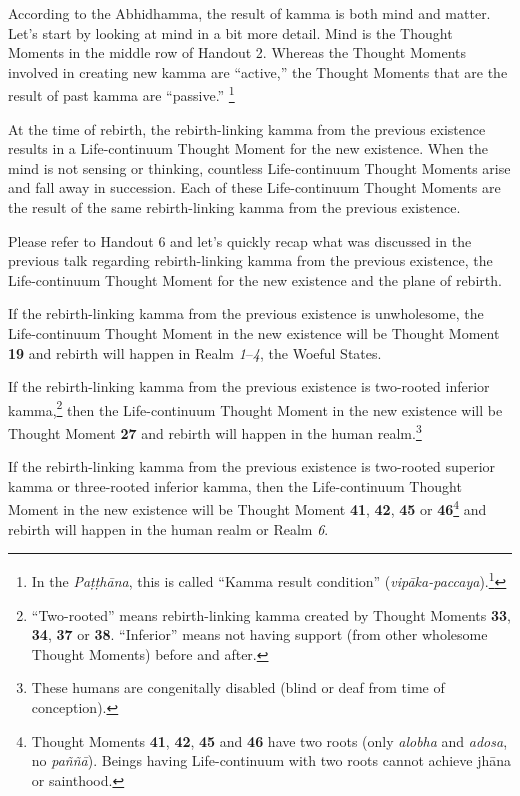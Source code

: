 According to the Abhidhamma, the result of kamma is both mind and matter. Let’s start by looking at mind in a bit more detail. Mind is the Thought Moments in the middle row of Handout 2. Whereas the Thought Moments involved in creating new kamma are “active,” the Thought Moments that are the result of past kamma are “passive.” \footnote{In the \textit{Paṭṭhāna}, this is called “Kamma result condition” (\textit{vipāka-paccaya}).\footnote{More details in Chapter 12 of “The Conditionality of Life” (see Footnote 2).}}

At the time of rebirth, the rebirth-linking kamma from the previous existence results in a Life-continuum Thought Moment for the new existence. When the mind is not sensing or thinking, countless Life-continuum Thought Moments arise and fall away in succession. Each of these Life-continuum Thought Moments are the result of the same rebirth-linking kamma from the previous existence.

Please refer to Handout 6 and let’s quickly recap what was discussed in the previous talk regarding rebirth-linking kamma from the previous existence, the Life-continuum Thought Moment for the new existence and the plane of rebirth.

If the rebirth-linking kamma from the previous existence is unwholesome, the Life-continuum Thought Moment in the new existence will be Thought Moment \textbf{19} and rebirth will happen in Realm \textit{1}--\textit{4}, the Woeful States. 

If the rebirth-linking kamma from the previous existence is two-rooted inferior kamma,\footnote{“Two-rooted” means rebirth-linking kamma created by Thought Moments \textbf{33}, \textbf{34}, \textbf{37} or \textbf{38}. “Inferior” means not having support (from other wholesome Thought Moments) before and after.} then the Life-continuum Thought Moment in the new existence will be Thought Moment \textbf{27} and rebirth will happen in the human realm.\footnote{These humans are congenitally disabled (blind or deaf from time of conception).}

If the rebirth-linking kamma from the previous existence is two-rooted superior kamma or three-rooted inferior kamma, then the Life-continuum Thought Moment in the new existence will be Thought Moment \textbf{41}, \textbf{42}, \textbf{45} or \textbf{46}\footnote{Thought Moments \textbf{41}, \textbf{42}, \textbf{45} and \textbf{46} have two roots (only \textit{alobha} and \textit{adosa}, no \textit{paññā}). Beings having Life-continuum with two roots cannot achieve jhāna or sainthood.} and rebirth will happen in the human realm or Realm \textit{6}. 

